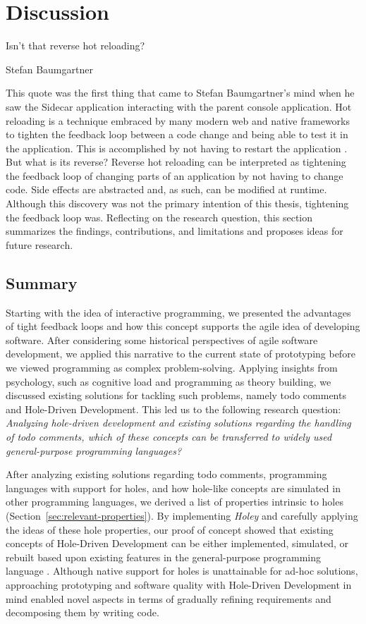\chapter{Discussion}
\label{cha:discussion}
\epigraph{Isn't that reverse hot reloading?}{Stefan Baumgartner}
\noindent This quote was the first thing that came to Stefan Baumgartner's mind when he saw the Sidecar application interacting with the parent console application.
Hot reloading is a technique embraced by many modern web and native frameworks to tighten the feedback loop between a code change and being able to test it in the application.
This is accomplished by not having to restart the application \cite{czaplicki_interactive_2013}.
But what is its reverse?
Reverse hot reloading can be interpreted as tightening the feedback loop of changing parts of an application by not having to change code.
Side effects are abstracted and, as such, can be modified at runtime.
Although this discovery was not the primary intention of this thesis, tightening the feedback loop was.
Reflecting on the research question, this section summarizes the findings, contributions, and limitations and proposes ideas for future research.

\section{Summary}
\label{sec:discussion-summary}
Starting with the idea of interactive programming, we presented the advantages of tight feedback loops and how this concept supports the agile idea of developing software.
After considering some historical perspectives of agile software development, we applied this narrative to the current state of prototyping before we viewed programming as complex problem-solving.
Applying insights from psychology, such as cognitive load and programming as theory building, we discussed existing solutions for tackling such problems, namely todo comments and Hole-Driven Development.
This led us to the following research question: \emph{Analyzing hole-driven development and existing solutions regarding the handling of todo comments, which of these concepts can be transferred to widely used general-purpose programming languages?}

After analyzing existing solutions regarding todo comments, programming languages with support for holes, and how hole-like concepts are simulated in other programming languages, we derived a list of properties intrinsic to holes (Section~\ref{sec:relevant-properties}).
By implementing \emph{Holey} and carefully applying the ideas of these hole properties, our proof of concept showed that existing concepts of Hole-Driven Development can be either implemented, simulated, or rebuilt based upon existing features in the general-purpose programming language \CS.
Although native support for holes is unattainable for ad-hoc solutions, approaching prototyping and software quality with Hole-Driven Development in mind enabled novel aspects in terms of gradually refining requirements and decomposing them by writing code.



